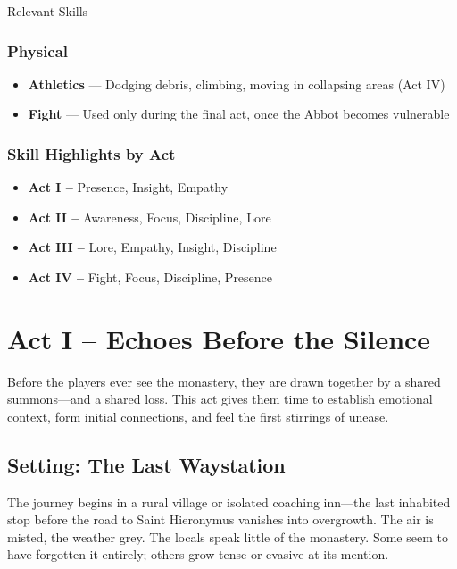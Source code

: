 \documentclass[nodeprecatedcode,bg=print]{dndbook/dndbook}
\begin{document}
\begin{WyrdSidebar}{Relevant Skills}
    \subsubsection{Physical}
    \begin{itemize}
        \item \textbf{Athletics} — Dodging debris, climbing, moving in collapsing areas (Act IV)
        \item \textbf{Fight} — Used only during the final act, once the Abbot becomes vulnerable
    \end{itemize}
    
    \subsubsection{Skill Highlights by Act}
    \begin{itemize}
        \item \textbf{Act I –} Presence, Insight, Empathy
        \item \textbf{Act II –} Awareness, Focus, Discipline, Lore
        \item \textbf{Act III –} Lore, Empathy, Insight, Discipline
        \item \textbf{Act IV –} Fight, Focus, Discipline, Presence
    \end{itemize}
    
\end{WyrdSidebar}
    

\section*{Act I – Echoes Before the Silence}

Before the players ever see the monastery, they are drawn together by a shared summons—and a shared loss. This act gives them time to establish emotional context, form initial connections, and feel the first stirrings of unease.

\vspace{0.5\baselineskip}

\subsection*{Setting: The Last Waystation}

The journey begins in a rural village or isolated coaching inn—the last inhabited stop before the road to Saint Hieronymus vanishes into overgrowth. The air is misted, the weather grey. The locals speak little of the monastery. Some seem to have forgotten it entirely; others grow tense or evasive at its mention.
\end{document}
